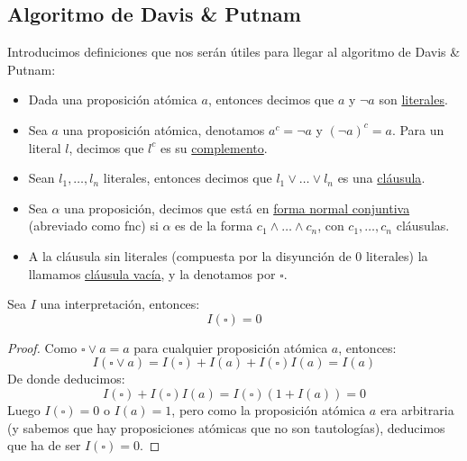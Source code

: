  \subsection{Algoritmo de Davis \& Putnam}
 \begin{definicion}
     Introducimos definiciones que nos serán útiles para llegar al algoritmo de Davis \& Putnam:
     \begin{itemize}
         \item Dada una proposición atómica $a$, entonces decimos que $a$ y $\lnot a$ son \underline{literales}.
         \item Sea $a$ una proposición atómica, denotamos $a^c = \lnot a$ y ${(\lnot a)}^{c} = a$. Para un literal $l$, decimos que $l^c$ es su \underline{complemento}.
         \item Sean $l_1,\ldots,l_n$ literales, entonces decimos que $l_1\lor \ldots \lor l_n$ es una \underline{cláusula}.
         \item Sea $\alpha$ una proposición, decimos que está en \underline{forma normal conjuntiva} (abreviado como fnc) si $\alpha$ es de la forma $c_1\land \ldots \land c_n$, con $c_1,\ldots,c_n$ cláusulas.
         \item A la cláusula sin literales (compuesta por la disyunción de 0 literales) la llamamos \underline{cláusula vacía}, y la denotamos por $\square$.
     \end{itemize}
 \end{definicion}

 \begin{prop}
     Sea $I$ una interpretación, entonces:
     \begin{equation*}
         I(\square) = 0
     \end{equation*}
     \begin{proof}
         Como $\square\lor a = a$ para cualquier proposición atómica $a$, entonces:
         \begin{equation*}
             I(\square\lor a) = I(\square) + I(a) + I(\square)I(a) = I(a)
         \end{equation*}
         De donde deducimos:
         \begin{equation*}
             I(\square) + I(\square)I(a) = I(\square)(1 + I(a)) = 0
         \end{equation*}
         Luego $I(\square)=0$ o $I(a)=1$, pero como la proposición atómica $a$ era arbitraria (y sabemos que hay proposiciones atómicas que no son tautologías), deducimos que ha de ser $I(\square)=0$.
     \end{proof}
 \end{prop}

